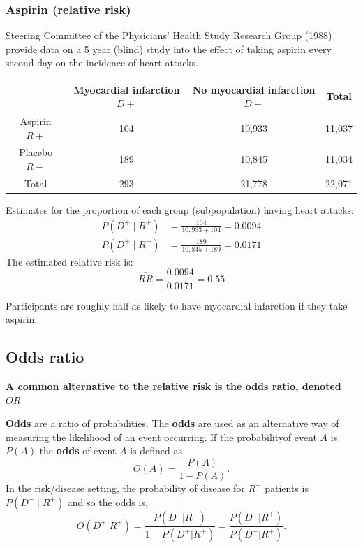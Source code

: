 \documentclass[a4paper]{article}\usepackage[]{graphicx}\usepackage[]{xcolor}
\begin{document}
\subsubsection{Aspirin (relative risk)}
Steering Committee of the Physicians' Health Study Research Group (1988) provide data on a 5 year (blind) study into the effect of taking aspirin every second day on the incidence of heart attacks.
\begin{table}[H]
	\centering
	\begin{tabular}{@{}cccc@{}}
	\toprule
		             & Myocardial infarction \( D+ \)  & No myocardial infarction \( D- \)  & Total \\ \midrule
	Aspirin \( R+ \) & 104	                           & 10,933                             & 11,037 \\
	Placebo \( R- \) & 189                             & 10,845                              & 11,034 \\
	Total            & 293                             & 21,778	                            & 22,071 \\ \bottomrule
	\end{tabular}
\end{table}
Estimates for the proportion of each group (subpopulation) having heart attacks:
\begin{align*}
	P(D^+ \mid R^+) & = \frac{104}{10,933 + 104} = 0.0094 \\
	P(D^+ \mid R^-) & = \frac{189}{10,845 + 189} = 0.0171
	\end{align*}
The estimated relative risk is: 
\[
	\widehat{RR} = \frac{0.0094}{0.0171} = 0.55
\]
\begin{tcolorbox}[bluestyleline]
	Participants are roughly half as likely to have myocardial infarction if they take aspirin.
\end{tcolorbox}
\subsection{Odds ratio}
\begin{goldbox}
	\textbf{A common alternative to the relative risk is the odds ratio, denoted} \( OR \) 
\end{goldbox}
\textbf{Odds} are a ratio of probabilities. The \textbf{odds} are used as an alternative way of measuring the likelihood of an event occurring.
If the probabilityof event \( A \) is \( P(A) \) the \textbf{odds} of event \( A \) is defined as
\[
O(A) = \frac{P(A)}{1-P(A)}.	
\]
In the risk/disease setting, the probability of disease for \( R^+ \) patients is \( P(D^+ \mid R^+) \) and so the odds is,
\[
	O(D^+|R^+) = \frac{P(D^+|R^+)}{1-P(D^+|R^+)}= \frac{P(D^+|R^+)}{P(D^-|R^+)}.
\]
\end{document}

